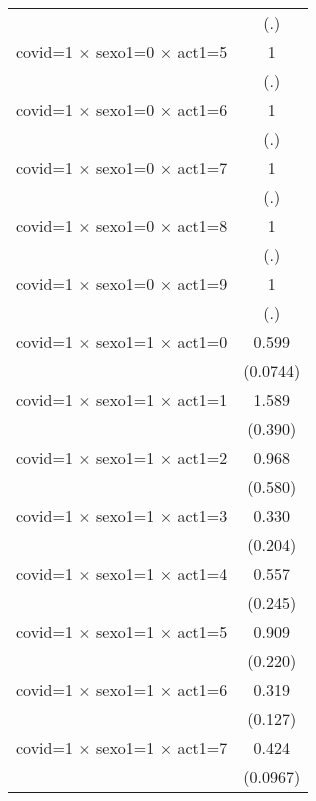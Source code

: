 {\begin{tabular}{l*{1}{c}}
                    &         (.)         \\
[1em]
covid=1 $\times$ sexo1=0 $\times$ act1=5&           1         \\
                    &         (.)         \\
[1em]
covid=1 $\times$ sexo1=0 $\times$ act1=6&           1         \\
                    &         (.)         \\
[1em]
covid=1 $\times$ sexo1=0 $\times$ act1=7&           1         \\
                    &         (.)         \\
[1em]
covid=1 $\times$ sexo1=0 $\times$ act1=8&           1         \\
                    &         (.)         \\
[1em]
covid=1 $\times$ sexo1=0 $\times$ act1=9&           1         \\
                    &         (.)         \\
[1em]
covid=1 $\times$ sexo1=1 $\times$ act1=0&       0.599\sym{***}\\
                    &    (0.0744)         \\
[1em]
covid=1 $\times$ sexo1=1 $\times$ act1=1&       1.589         \\
                    &     (0.390)         \\
[1em]
covid=1 $\times$ sexo1=1 $\times$ act1=2&       0.968         \\
                    &     (0.580)         \\
[1em]
covid=1 $\times$ sexo1=1 $\times$ act1=3&       0.330         \\
                    &     (0.204)         \\
[1em]
covid=1 $\times$ sexo1=1 $\times$ act1=4&       0.557         \\
                    &     (0.245)         \\
[1em]
covid=1 $\times$ sexo1=1 $\times$ act1=5&       0.909         \\
                    &     (0.220)         \\
[1em]
covid=1 $\times$ sexo1=1 $\times$ act1=6&       0.319\sym{**} \\
                    &     (0.127)         \\
[1em]
covid=1 $\times$ sexo1=1 $\times$ act1=7&       0.424\sym{***}\\
                    &    (0.0967)         \\

\end{tabular}}
